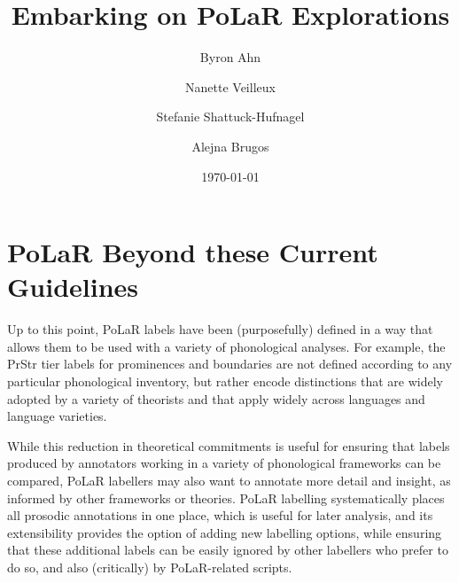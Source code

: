 \documentclass[11pt, twoside]{memoir}
\def\THIStitle{Embarking on PoLaR Explorations}
\def\THISsubtitle{A Framework for Intonational Annotation and Analysis}
\begin{document}
\frontmatter
{}

\title{\THIStitle}
\author{Byron Ahn \and Nanette Veilleux \and Stefanie Shattuck-Hufnagel \and Alejna Brugos}
\date{\today}


\tableofcontents
\newpage
\listoffigures
\listoftables
\newpage

\mainmatter

\chapter{PoLaR Beyond these Current Guidelines}\label{ch:beyond}
Up to this point, PoLaR labels have been (purposefully) defined in a way that allows them to be used with a variety of phonological analyses. For example, the PrStr tier labels for prominences and boundaries  are not defined according to any particular phonological inventory, but rather encode distinctions that are widely adopted by a variety of theorists and that apply widely across languages and language varieties.

While this reduction in theoretical commitments is useful for ensuring that labels produced by annotators working in a variety of phonological frameworks can be compared, PoLaR labellers may also want to annotate more detail and insight, as informed by other frameworks or theories. PoLaR labelling systematically places all prosodic annotations in one place, which is useful for later analysis, and its extensibility provides the option of adding new labelling options, while ensuring that these additional labels can be easily ignored by other labellers who prefer to do so, and also (critically) by PoLaR-related scripts.
\end{document}
